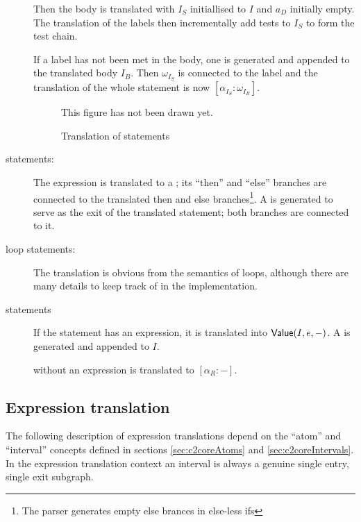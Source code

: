 \begin{docpart}
\begin{description}
        Then the body is translated with $I_S$ initiallised
        to $I$ and $a_D$ initially empty. The translation of
        the  labels then incrementally add
        tests to $I_S$ to form the test chain.

        If a  label has not been met in the
        body, one is generated and appended to the translated
        body $I_B$. Then $\omega_{I_S}$ is connected to the
         label and the translation of the
        whole  statement is now $[\alpha_{I_S}:\omega_{I_B}]$.

\begin{figure}
  \begin{frameit}
  \begin{center}
        This figure has not been drawn yet.
  \end{center}
  \end{frameit}
  \caption{Translation of  statements}
  \label{fig:c2coreSwitch}
\end{figure}

\item[\syntax{if} statements:] The expression is translated
        to a ; its ``then'' and ``else'' branches
        are connected to the translated then and else
        branches\footnote
                {The \ansiC parser generates empty
                else brances in else-less ifs}.
        A  is generated to serve as the exit
        of the translated statement; both branches are connected
        to it.
\item[loop statements:] The translation is obvious from the
        semantics of \ansiC loops, although there are many
        details to keep track of in the implementation.
\item[\syntax{return} statements] If the  statement
        has an expression, it is translated into
        $\textsf{Value}(I,e,-)$. A  is generated
        and appended to $I$.

         without an expression is translated to
        $[\alpha_R:-]$.
\end{description}

\subsection{Expression translation}
The following description of expression translations depend
on the ``atom'' and ``interval'' concepts defined in sections
\ref{sec:c2coreAtoms} and \ref{sec:c2coreIntervals}. In the
expression translation context an interval is always a
genuine single entry, single exit subgraph.


\end{docpart}
